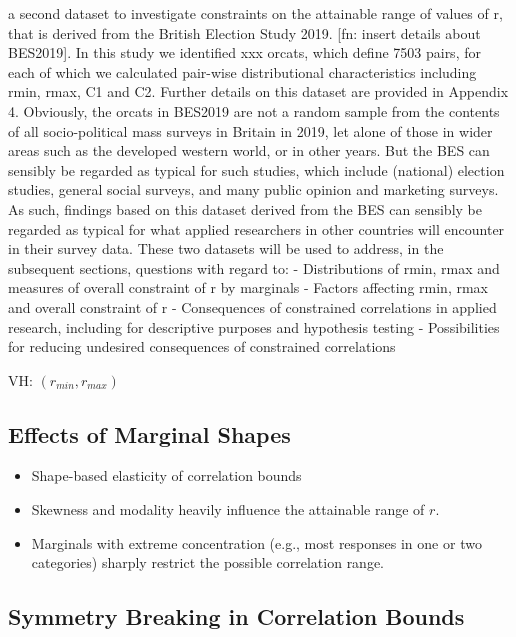 \documentclass[
  12pt,
]{article}
\providecommand{\tightlist}{%
  \setlength{\itemsep}{0pt}\setlength{\parskip}{0pt}}
\theoremstyle{plain}
\theoremstyle{definition}
\theoremstyle{remark}
\begin{document}
a second dataset to investigate constraints on the attainable range of
values of r, that is derived from the British Election Study 2019.
{[}fn: insert details about BES2019{]}. In this study we identified xxx
orcats, which define 7503 pairs, for each of which we calculated
pair-wise distributional characteristics including rmin, rmax, C1 and
C2. Further details on this dataset are provided in Appendix 4.
Obviously, the orcats in BES2019 are not a random sample from the
contents of all socio-political mass surveys in Britain in 2019, let
alone of those in wider areas such as the developed western world, or in
other years. But the BES can sensibly be regarded as typical for such
studies, which include (national) election studies, general social
surveys, and many public opinion and marketing surveys. As such,
findings based on this dataset derived from the BES can sensibly be
regarded as typical for what applied researchers in other countries will
encounter in their survey data. These two datasets will be used to
address, in the subsequent sections, questions with regard to: -
Distributions of rmin, rmax and measures of overall constraint of r by
marginals - Factors affecting rmin, rmax and overall constraint of r -
Consequences of constrained correlations in applied research, including
for descriptive purposes and hypothesis testing - Possibilities for
reducing undesired consequences of constrained correlations

VH: \((r_{min}, r_{max})\)

\subsection{Effects of Marginal
Shapes}\label{effects-of-marginal-shapes}

\begin{itemize}
\tightlist
\item
  Shape-based elasticity of correlation bounds\\
\item
  Skewness and modality heavily influence the attainable range of \(r\).
\item
  Marginals with extreme concentration (e.g., most responses in one or
  two categories) sharply restrict the possible correlation range.
\end{itemize}

\subsection{Symmetry Breaking in Correlation
Bounds}\label{symmetry-breaking-in-correlation-bounds}
\end{document}
